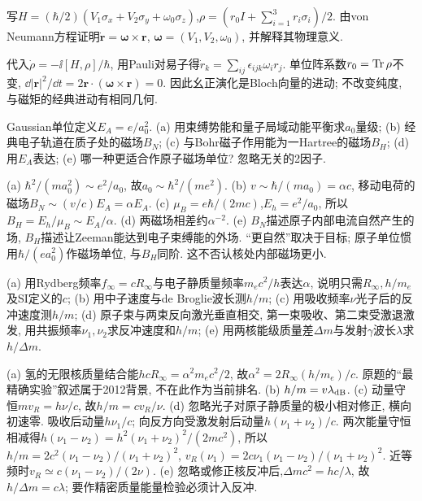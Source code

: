 \begin{exercise}写$H=(\hbar/2)(V_1\sigma_x+V_2\sigma_y+\omega_0\sigma_z)$,$\rho=(r_0I+\sum_{i=1}^3r_i\sigma_i)/2$. 由von Neumann方程证明$\dot{\mathbf r}=\boldsymbol\omega\times\mathbf r$, $\boldsymbol\omega=(V_1,V_2,\omega_0)$, 并解释其物理意义.\end{exercise}
\begin{solution}代入$\dot\rho=-\ii[H,\rho]/\hbar$, 用Pauli对易子得$\dot r_k=\sum_{ij}\epsilon_{ijk}\omega_ir_j$. 单位阵系数$r_0=\operatorname{Tr}\rho$不变, $\dd|\mathbf r|^2/\dd t=2\mathbf r\cdot(\boldsymbol\omega\times\mathbf r)=0$. 因此幺正演化是Bloch向量的进动; 不改变纯度, 与磁矩的经典进动有相同几何.
\end{solution}

\begin{exercise}Gaussian单位定义$E_A=e/a_0^2$. (a) 用束缚势能和量子局域动能平衡求$a_0$量级; (b) 经典电子轨道在质子处的磁场$B_N$; (c) 与Bohr磁子作用能为一Hartree的磁场$B_H$; (d) 用$E_A$表达; (e) 哪一种更适合作原子磁场单位? 忽略无关的2因子.\end{exercise}
\begin{solution}(a) $\hbar^2/(ma_0^2)\sim e^2/a_0$, 故$a_0\sim\hbar^2/(me^2)$. (b) $v\sim\hbar/(ma_0)=\alpha c$, 移动电荷的磁场$B_N\sim(v/c)E_A=\alpha E_A$. (c) $\mu_B=e\hbar/(2mc)$,$E_h=e^2/a_0$, 所以$B_H=E_h/\mu_B\sim E_A/\alpha$. (d) 两磁场相差约$\alpha^{-2}$. (e) $B_N$描述原子内部电流自然产生的场, $B_H$描述让Zeeman能达到电子束缚能的外场. “更自然”取决于目标; 原子单位惯用$\hbar/(ea_0^2)$作磁场单位, 与$B_H$同阶. 这不否认核处内部磁场更小.
\end{solution}
\begin{exercise}(a) 用Rydberg频率$f_\infty=cR_\infty$与电子静质量频率$m_ec^2/h$表达$\alpha$, 说明只需$R_\infty,h/m_e$及SI定义的$c$; (b) 用中子速度与de Broglie波长测$h/m$; (c) 用吸收频率$\nu$光子后的反冲速度测$h/m$; (d) 原子束与两束反向激光垂直相交, 第一束吸收、第二束受激退激发, 用共振频率$\nu_1,\nu_2$求反冲速度和$h/m$; (e) 用两核能级质量差$\Delta m$与发射$\gamma$波长$\lambda$求$h/\Delta m$.\end{exercise}
\begin{solution}(a) 氢的无限核质量结合能$hcR_\infty=\alpha^2m_ec^2/2$, 故$\alpha^2=2R_\infty(h/m_e)/c$. 原题的“最精确实验”叙述属于2012背景, 不在此作为当前排名. (b) $h/m=v\lambda_{\rm dB}$. (c) 动量守恒$mv_R=h\nu/c$, 故$h/m=cv_R/\nu$. (d) 忽略光子对原子静质量的极小相对修正, 横向初速零. 吸收后动量$h\nu_1/c$; 向反方向受激发射后动量$h(\nu_1+\nu_2)/c$. 两次能量守恒相减得$h(\nu_1-\nu_2)=h^2(\nu_1+\nu_2)^2/(2mc^2)$, 所以$h/m=2c^2(\nu_1-\nu_2)/(\nu_1+\nu_2)^2$, $v_R(\nu_1)=2c\nu_1(\nu_1-\nu_2)/(\nu_1+\nu_2)^2$. 近等频时$v_R\simeq c(\nu_1-\nu_2)/(2\nu)$. (e) 忽略或修正核反冲后,$\Delta mc^2=hc/\lambda$, 故$h/\Delta m=c\lambda$; 要作精密质量能量检验必须计入反冲.
\end{solution}

